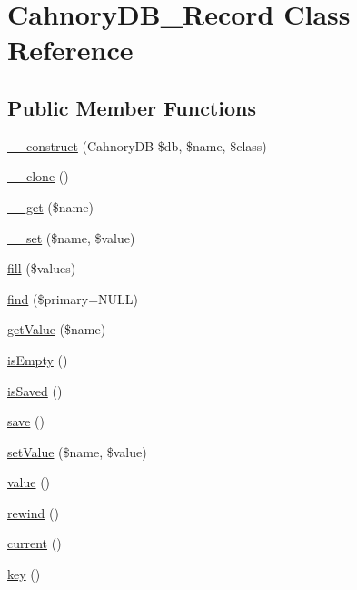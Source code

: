 \hypertarget{class_cahnory_d_b___record}{
\section{CahnoryDB\_\-Record Class Reference}
\label{class_cahnory_d_b___record}
}
\subsection*{Public Member Functions}
\begin{CompactItemize}
\item 
\hyperlink{class_cahnory_d_b___record_c28688e5850a284aaa96a469ee21424e}{\_\-\_\-construct} (CahnoryDB \$db, \$name, \$class)
\item 
\hyperlink{class_cahnory_d_b___record_d0cb87b388bc74d63dc884accdca8713}{\_\-\_\-clone} ()
\item 
\hyperlink{class_cahnory_d_b___record_bc8e9e31bb15c8a44c3210ec551407c8}{\_\-\_\-get} (\$name)
\item 
\hyperlink{class_cahnory_d_b___record_83c2703c91959192f759992ad5640b67}{\_\-\_\-set} (\$name, \$value)
\item 
\hyperlink{class_cahnory_d_b___record_e8ed0112c0675ef955f6b14917b3e13d}{fill} (\$values)
\item 
\hyperlink{class_cahnory_d_b___record_3e9c1a619dd1ff40931b92383c37b403}{find} (\$primary=NULL)
\item 
\hyperlink{class_cahnory_d_b___record_8c584efa272687554bd9abe5e83fe10c}{getValue} (\$name)
\item 
\hyperlink{class_cahnory_d_b___record_edcc52b3673b8df9425e52f13accb2a1}{isEmpty} ()
\item 
\hyperlink{class_cahnory_d_b___record_6b93ceb8cecf73af4c402ffb4c184e45}{isSaved} ()
\item 
\hyperlink{class_cahnory_d_b___record_fc8a3c62679cf00ade9f15fb2a6d6132}{save} ()
\item 
\hyperlink{class_cahnory_d_b___record_8e7aaacf604710d7f853f3261d84b9fc}{setValue} (\$name, \$value)
\item 
\hyperlink{class_cahnory_d_b___record_efbfa229f1c9e1fc967bff724a010f9e}{value} ()
\item 
\hyperlink{class_cahnory_d_b___record_e619dcf2218c21549cb65d875bbc6c9c}{rewind} ()
\item 
\hyperlink{class_cahnory_d_b___record_f343507d1926e6ecf964625d41db528c}{current} ()
\item 
\hyperlink{class_cahnory_d_b___record_729e946b4ef600e71740113c6d4332c0}{key} ()

\end{CompactItemize}
